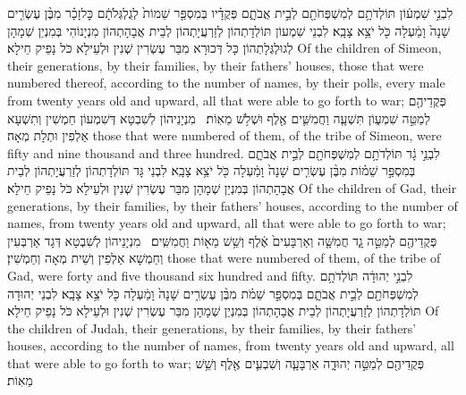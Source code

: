 {לִבְנֵ֣י שִׁמְע֔וֹן תּוֹלְדֹתָ֥ם לְמִשְׁפְּחֹתָ֖ם לְבֵ֣ית אֲבֹתָ֑ם פְּקֻדָ֗יו בְּמִסְפַּ֤ר שֵׁמוֹת֙ לְגֻלְגְּלֹתָ֔ם כׇּל\maqqaf זָכָ֗ר מִבֶּ֨ן עֶשְׂרִ֤ים שָׁנָה֙ וָמַ֔עְלָה כֹּ֖ל יֹצֵ֥א צָבָֽא׃}
{לִבְנֵי שִׁמְעוֹן תּוֹלְדָתְהוֹן לְזַרְעֲיָתְהוֹן לְבֵית אֲבָהָתְהוֹן מִנְיָנוֹהִי בְּמִנְיַן שְׁמָהָן לְגוּלְגְּלָתְהוֹן כָּל דְּכוּרָא מִבַּר עֶשְׂרִין שְׁנִין וּלְעֵילָא כֹּל נָפֵיק חֵילָא׃}
{Of the children of Simeon, their generations, by their families, by their fathers’ houses, those that were numbered thereof, according to the number of names, by their polls, every male from twenty years old and upward, all that were able to go forth to war;}{}
{פְּקֻדֵיהֶ֖ם לְמַטֵּ֣ה שִׁמְע֑וֹן תִּשְׁעָ֧ה וַחֲמִשִּׁ֛ים אֶ֖לֶף וּשְׁלֹ֥שׁ מֵאֽוֹת׃ \petucha }
{מִנְיָנֵיהוֹן לְשִׁבְטָא דְּשִׁמְעוֹן חַמְשִׁין וְתִשְׁעָא אַלְפִין וּתְלָת מְאָה׃}
{those that were numbered of them, of the tribe of Simeon, were fifty and nine thousand and three hundred.}{}
{לִבְנֵ֣י גָ֔ד תּוֹלְדֹתָ֥ם לְמִשְׁפְּחֹתָ֖ם לְבֵ֣ית אֲבֹתָ֑ם בְּמִסְפַּ֣ר שֵׁמ֗וֹת מִבֶּ֨ן עֶשְׂרִ֤ים שָׁנָה֙ וָמַ֔עְלָה כֹּ֖ל יֹצֵ֥א צָבָֽא׃}
{לִבְנֵי גָּד תּוֹלְדָתְהוֹן לְזַרְעֲיָתְהוֹן לְבֵית אֲבָהָתְהוֹן בְּמִנְיַן שְׁמָהָן מִבַּר עֶשְׂרִין שְׁנִין וּלְעֵילָא כֹּל נָפֵיק חֵילָא׃}
{Of the children of Gad, their generations, by their families, by their fathers’ houses, according to the number of names, from twenty years old and upward, all that were able to go forth to war;}{}
{פְּקֻדֵיהֶ֖ם לְמַטֵּ֣ה גָ֑ד חֲמִשָּׁ֤ה וְאַרְבָּעִים֙ אֶ֔לֶף וְשֵׁ֥שׁ מֵא֖וֹת וַחֲמִשִּֽׁים׃ \petucha }
{מִנְיָנֵיהוֹן לְשִׁבְטָא דְּגָד אַרְבְּעִין וְחַמְשָׁא אַלְפִין וְשֵׁית מְאָה וְחַמְשִׁין׃}
{those that were numbered of them, of the tribe of Gad, were forty and five thousand six hundred and fifty.}{}
{לִבְנֵ֣י יְהוּדָ֔ה תּוֹלְדֹתָ֥ם לְמִשְׁפְּחֹתָ֖ם לְבֵ֣ית אֲבֹתָ֑ם בְּמִסְפַּ֣ר שֵׁמֹ֗ת מִבֶּ֨ן עֶשְׂרִ֤ים שָׁנָה֙ וָמַ֔עְלָה כֹּ֖ל יֹצֵ֥א צָבָֽא׃}
{לִבְנֵי יְהוּדָה תּוֹלְדָתְהוֹן לְזַרְעֲיָתְהוֹן לְבֵית אֲבָהָתְהוֹן בְּמִנְיַן שְׁמָהָן מִבַּר עֶשְׂרִין שְׁנִין וּלְעֵילָא כֹּל נָפֵיק חֵילָא׃}
{Of the children of Judah, their generations, by their families, by their fathers’ houses, according to the number of names, from twenty years old and upward, all that were able to go forth to war;}{}
{פְּקֻדֵיהֶ֖ם לְמַטֵּ֣ה יְהוּדָ֑ה אַרְבָּעָ֧ה וְשִׁבְעִ֛ים אֶ֖לֶף וְשֵׁ֥שׁ מֵאֽוֹת׃ \petucha }

